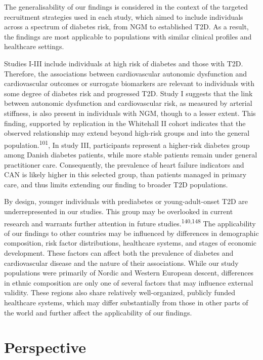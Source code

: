 \documentclass[
  letterpaper,
  headsepline=true,
  open=any]{scrbook}
\begin{document}
The generalisability of our findings is considered in the context of the
targeted recruitment strategies used in each study, which aimed to
include individuals across a spectrum of diabetes risk, from NGM to
established T2D. As a result, the findings are most applicable to
populations with similar clinical profiles and healthcare settings.

Studies I-III include individuals at high risk of diabetes and those
with T2D. Therefore, the associations between cardiovascular autonomic
dysfunction and cardiovascular outcomes or surrogate biomarkers are
relevant to individuals with some degree of diabetes risk and progressed
T2D. Study I suggests that the link between autonomic dysfunction and
cardiovascular risk, as measured by arterial stiffness, is also present
in individuals with NGM, though to a lesser extent. This finding,
supported by replication in the Whitehall II cohort indicates that the
observed relationship may extend beyond high-risk groups and into the
general population.\textsuperscript{101}, In study III, participants
represent a higher-risk diabetes group among Danish diabetes patients,
while more stable patients remain under general practitioner care.
Consequently, the prevalence of heart failure indicators and CAN is
likely higher in this selected group, than patients managed in primary
care, and thus limits extending our finding to broader T2D populations.

By design, younger individuals with prediabetes or young-adult-onset T2D
are underrepresented in our studies. This group may be overlooked in
current research and warrants further attention in future
studies.\textsuperscript{140,148} The applicability of our findings to
other countries may be influenced by differences in demographic
composition, risk factor distributions, healthcare systems, and stages
of economic development. These factors can affect both the prevalence of
diabetes and cardiovascular disease and the nature of their
associations. While our study populations were primarily of Nordic and
Western European descent, differences in ethnic composition are only one
of several factors that may influence external validity. These regions
also share relatively well-organized, publicly funded healthcare
systems, which may differ substantially from those in other parts of the
world and further affect the applicability of our findings.


\hypertarget{perspective}{%
\chapter{Perspective}\label{perspective}}
\end{document}
